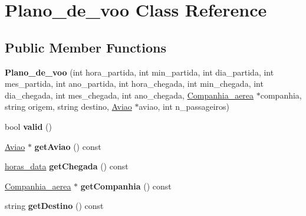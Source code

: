 \hypertarget{class_plano__de__voo}{
\section{Plano\_\-de\_\-voo Class Reference}
\label{class_plano__de__voo}
}
\subsection*{Public Member Functions}
\begin{DoxyCompactItemize}
\item 
\hypertarget{class_plano__de__voo_a4c56b773a9eb349a4a75ba7482bea950}{
{\bfseries Plano\_\-de\_\-voo} (int hora\_\-partida, int min\_\-partida, int dia\_\-partida, int mes\_\-partida, int ano\_\-partida, int hora\_\-chegada, int min\_\-chegada, int dia\_\-chegada, int mes\_\-chegada, int ano\_\-chegada, \hyperlink{class_companhia__aerea}{Companhia\_\-aerea} $\ast$companhia, string origem, string destino, \hyperlink{class_aviao}{Aviao} $\ast$aviao, int n\_\-passageiros)}
\label{class_plano__de__voo_a4c56b773a9eb349a4a75ba7482bea950}

\item 
\hypertarget{class_plano__de__voo_aba8bb79fce8496e9ff524d3cf08aedc7}{
bool {\bfseries valid} ()}
\label{class_plano__de__voo_aba8bb79fce8496e9ff524d3cf08aedc7}

\item 
\hypertarget{class_plano__de__voo_af6dd7c1d5c026cc306ab137c0fafabcf}{
\hyperlink{class_aviao}{Aviao} $\ast$ {\bfseries getAviao} () const }
\label{class_plano__de__voo_af6dd7c1d5c026cc306ab137c0fafabcf}

\item 
\hypertarget{class_plano__de__voo_a3673b8b7c494a4937087aea4414d8fc9}{
\hyperlink{structhoras__data}{horas\_\-data} {\bfseries getChegada} () const }
\label{class_plano__de__voo_a3673b8b7c494a4937087aea4414d8fc9}

\item 
\hypertarget{class_plano__de__voo_aef1361f4defc75d29230136e523d5500}{
\hyperlink{class_companhia__aerea}{Companhia\_\-aerea} $\ast$ {\bfseries getCompanhia} () const }
\label{class_plano__de__voo_aef1361f4defc75d29230136e523d5500}

\item 
\hypertarget{class_plano__de__voo_a345493b0882497fe94d8caf21ee8f4af}{
string {\bfseries getDestino} () const }
\label{class_plano__de__voo_a345493b0882497fe94d8caf21ee8f4af}


\end{DoxyCompactItemize}
